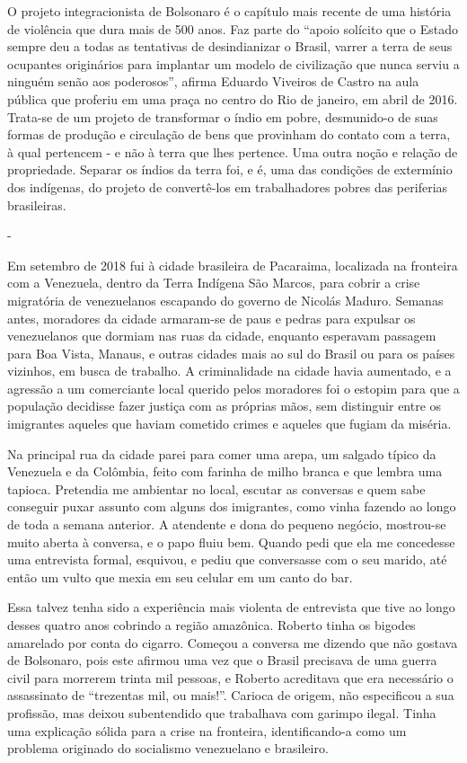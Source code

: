 O projeto integracionista de Bolsonaro é o capítulo mais recente de uma
história de violência que dura mais de 500 anos. Faz parte do ``apoio
solícito que o Estado sempre deu a todas as tentativas de desindianizar
o Brasil, varrer a terra de seus ocupantes originários para implantar um
modelo de civilização que nunca serviu a ninguém senão aos poderosos'',
afirma Eduardo Viveiros de Castro na aula pública que proferiu em uma
praça no centro do Rio de janeiro, em abril de 2016. Trata-se de um
projeto de transformar o índio em pobre, desmunido-o de suas formas de
produção e circulação de bens que provinham do contato com a terra, à
qual pertencem - e não à terra que lhes pertence. Uma outra noção e
relação de propriedade. Separar os índios da terra foi, e é, uma das
condições de extermínio dos indígenas, do projeto de convertê-los em
trabalhadores pobres das periferias brasileiras.

-

Em setembro de 2018 fui à cidade brasileira de Pacaraima, localizada na
fronteira com a Venezuela, dentro da Terra Indígena São Marcos, para
cobrir a crise migratória de venezuelanos escapando do governo de
Nicolás Maduro. Semanas antes, moradores da cidade armaram-se de paus e
pedras para expulsar os venezuelanos que dormiam nas ruas da cidade,
enquanto esperavam passagem para Boa Vista, Manaus, e outras cidades
mais ao sul do Brasil ou para os países vizinhos, em busca de trabalho.
A criminalidade na cidade havia aumentado, e a agressão a um comerciante
local querido pelos moradores foi o estopim para que a população
decidisse fazer justiça com as próprias mãos, sem distinguir entre os
imigrantes aqueles que haviam cometido crimes e aqueles que fugiam da
miséria.

Na principal rua da cidade parei para comer uma arepa, um salgado típico
da Venezuela e da Colômbia, feito com farinha de milho branca e que
lembra uma tapioca. Pretendia me ambientar no local, escutar as
conversas e quem sabe conseguir puxar assunto com alguns dos imigrantes,
como vinha fazendo ao longo de toda a semana anterior. A atendente e
dona do pequeno negócio, mostrou-se muito aberta à conversa, e o papo
fluiu bem. Quando pedi que ela me concedesse uma entrevista formal,
esquivou, e pediu que conversasse com o seu marido, até então um vulto
que mexia em seu celular em um canto do bar.

Essa talvez tenha sido a experiência mais violenta de entrevista que
tive ao longo desses quatro anos cobrindo a região amazônica. Roberto
tinha os bigodes amarelado por conta do cigarro. Começou a conversa me
dizendo que não gostava de Bolsonaro, pois este afirmou uma vez que o
Brasil precisava de uma guerra civil para morrerem trinta mil pessoas, e
Roberto acreditava que era necessário o assassinato de ``trezentas mil,
ou mais!''. Carioca de origem, não especificou a sua profissão, mas
deixou subentendido que trabalhava com garimpo ilegal. Tinha uma
explicação sólida para a crise na fronteira, identificando-a como um
problema originado do socialismo venezuelano e brasileiro.

